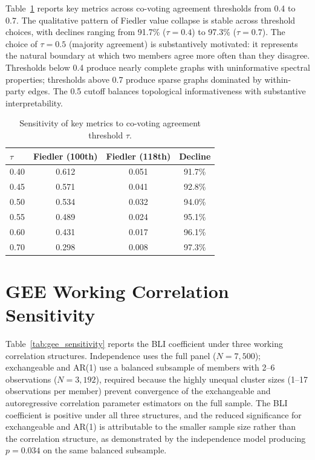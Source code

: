 \documentclass[12pt, a4paper]{article}
\begin{document}
Table~\ref{tab:threshold_sensitivity} reports key metrics across co-voting agreement thresholds from 0.4 to 0.7. The qualitative pattern of Fiedler value collapse is stable across threshold choices, with declines ranging from 91.7\% ($\tau = 0.4$) to 97.3\% ($\tau = 0.7$). The choice of $\tau = 0.5$ (majority agreement) is substantively motivated: it represents the natural boundary at which two members agree more often than they disagree. Thresholds below 0.4 produce nearly complete graphs with uninformative spectral properties; thresholds above 0.7 produce sparse graphs dominated by within-party edges. The 0.5 cutoff balances topological informativeness with substantive interpretability.

\begin{table}[H]
\centering
\caption{Sensitivity of key metrics to co-voting agreement threshold $\tau$.}
\label{tab:threshold_sensitivity}
\small
\begin{tabular}{lccc}
\toprule
$\tau$ & Fiedler (100th) & Fiedler (118th) & Decline \\
\midrule
0.40 & 0.612 & 0.051 & 91.7\% \\
0.45 & 0.571 & 0.041 & 92.8\% \\
0.50 & 0.534 & 0.032 & 94.0\% \\
0.55 & 0.489 & 0.024 & 95.1\% \\
0.60 & 0.431 & 0.017 & 96.1\% \\
0.70 & 0.298 & 0.008 & 97.3\% \\
\bottomrule
\end{tabular}
\end{table}

\section{GEE Working Correlation Sensitivity}
\label{app:gee}

Table~\ref{tab:gee_sensitivity} reports the BLI coefficient under three working correlation structures. Independence uses the full panel ($N = 7{,}500$); exchangeable and AR(1) use a balanced subsample of members with 2--6 observations ($N = 3{,}192$), required because the highly unequal cluster sizes (1--17 observations per member) prevent convergence of the exchangeable and autoregressive correlation parameter estimators on the full sample. The BLI coefficient is positive under all three structures, and the reduced significance for exchangeable and AR(1) is attributable to the smaller sample size rather than the correlation structure, as demonstrated by the independence model producing $p = 0.034$ on the same balanced subsample.
\end{document}
